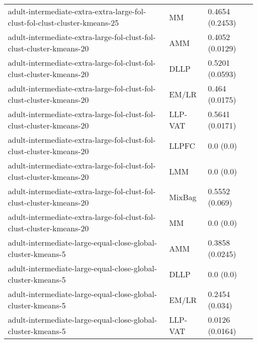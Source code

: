 \begin{longtable}{lll}
                                   adult-intermediate-extra-extra-large-fol-clust-fol-clust-cluster-kmeans-25 &        MM &                       0.4654 (0.2453) \\
                                         adult-intermediate-extra-large-fol-clust-fol-clust-cluster-kmeans-20 &       AMM &                       0.4052 (0.0129) \\
                                         adult-intermediate-extra-large-fol-clust-fol-clust-cluster-kmeans-20 &      DLLP &                       0.5201 (0.0593) \\
                                         adult-intermediate-extra-large-fol-clust-fol-clust-cluster-kmeans-20 &     EM/LR &                        0.464 (0.0175) \\
                                         adult-intermediate-extra-large-fol-clust-fol-clust-cluster-kmeans-20 &   LLP-VAT &                       0.5641 (0.0171) \\
                                         adult-intermediate-extra-large-fol-clust-fol-clust-cluster-kmeans-20 &     LLPFC &                             0.0 (0.0) \\
                                         adult-intermediate-extra-large-fol-clust-fol-clust-cluster-kmeans-20 &       LMM &                             0.0 (0.0) \\
                                         adult-intermediate-extra-large-fol-clust-fol-clust-cluster-kmeans-20 &    MixBag &                        0.5552 (0.069) \\
                                         adult-intermediate-extra-large-fol-clust-fol-clust-cluster-kmeans-20 &        MM &                             0.0 (0.0) \\
                                                 adult-intermediate-large-equal-close-global-cluster-kmeans-5 &       AMM &                       0.3858 (0.0245) \\
                                                 adult-intermediate-large-equal-close-global-cluster-kmeans-5 &      DLLP &                             0.0 (0.0) \\
                                                 adult-intermediate-large-equal-close-global-cluster-kmeans-5 &     EM/LR &                        0.2454 (0.034) \\
                                                 adult-intermediate-large-equal-close-global-cluster-kmeans-5 &   LLP-VAT &                       0.0126 (0.0164) \\

\end{longtable}
